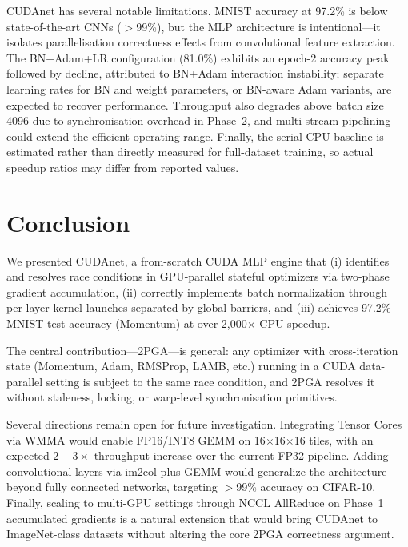 \documentclass[conference]{IEEEtran}
\begin{document}
CUDAnet has several notable limitations. MNIST accuracy at 97.2\% is below state-of-the-art CNNs ($>$99\%), but the MLP architecture is intentional—it isolates parallelisation correctness effects from convolutional feature extraction. The BN+Adam+LR configuration (81.0\%) exhibits an epoch-2 accuracy peak followed by decline, attributed to BN+Adam interaction instability; separate learning rates for BN and weight parameters, or BN-aware Adam variants, are expected to recover performance. Throughput also degrades above batch size 4096 due to synchronisation overhead in Phase~2, and multi-stream pipelining could extend the efficient operating range. Finally, the serial CPU baseline is estimated rather than directly measured for full-dataset training, so actual speedup ratios may differ from reported values.

\section{Conclusion}

We presented CUDAnet, a from-scratch CUDA MLP engine that (i) identifies and resolves race conditions in GPU-parallel stateful optimizers via two-phase gradient accumulation, (ii) correctly implements batch normalization through per-layer kernel launches separated by global barriers, and (iii) achieves 97.2\% MNIST test accuracy (Momentum) at over 2{,}000$\times$ CPU speedup.

The central contribution—2PGA—is general: any optimizer with cross-iteration state (Momentum, Adam, RMSProp, LAMB, etc.) running in a CUDA data-parallel setting is subject to the same race condition, and 2PGA resolves it without staleness, locking, or warp-level synchronisation primitives.

Several directions remain open for future investigation. Integrating Tensor Cores via WMMA would enable FP16/INT8 GEMM on 16$\times$16$\times$16 tiles, with an expected $2\!-\!3\times$ throughput increase over the current FP32 pipeline. Adding convolutional layers via im2col plus GEMM would generalize the architecture beyond fully connected networks, targeting $>$99\% accuracy on CIFAR-10. Finally, scaling to multi-GPU settings through NCCL AllReduce on Phase~1 accumulated gradients is a natural extension that would bring CUDAnet to ImageNet-class datasets without altering the core 2PGA correctness argument.
\end{document}
